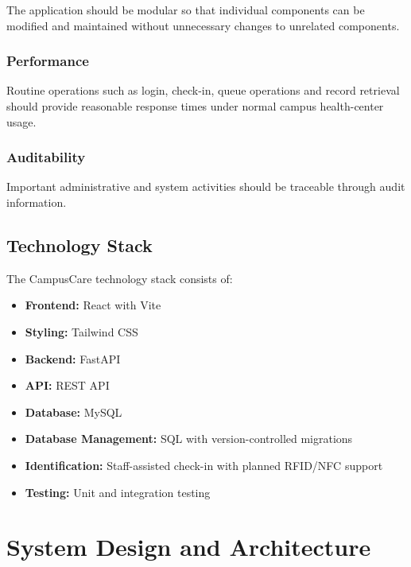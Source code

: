\documentclass{tietreport}
\begin{document}
The application should be modular so that individual components can
be modified and maintained without unnecessary changes to unrelated
components.

\subsection{Performance}

Routine operations such as login, check-in, queue operations and
record retrieval should provide reasonable response times under
normal campus health-center usage.

\subsection{Auditability}

Important administrative and system activities should be traceable
through audit information.

\section{Technology Stack}

The CampusCare technology stack consists of:

\begin{itemize}
    \item \textbf{Frontend:} React with Vite
    \item \textbf{Styling:} Tailwind CSS
    \item \textbf{Backend:} FastAPI
    \item \textbf{API:} REST API
    \item \textbf{Database:} MySQL
    \item \textbf{Database Management:} SQL with
    version-controlled migrations
    \item \textbf{Identification:} Staff-assisted check-in with
    planned RFID/NFC support
    \item \textbf{Testing:} Unit and integration testing
\end{itemize}



\chapter{System Design and Architecture}
\end{document}
